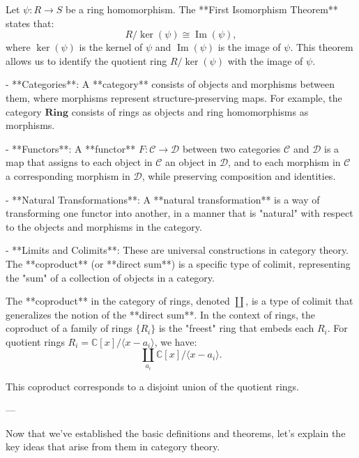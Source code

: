 \documentclass[11pt,openany]{article}
\begin{document}
Let \( \psi: R \to S \) be a ring homomorphism. The **First Isomorphism Theorem** states that:
\[
R / \ker(\psi) \cong \operatorname{Im}(\psi),
\]
where \( \ker(\psi) \) is the kernel of \( \psi \) and \( \operatorname{Im}(\psi) \) is the image of \( \psi \). This theorem allows us to identify the quotient ring \( R / \ker(\psi) \) with the image of \( \psi \).


- **Categories**: A **category** consists of objects and morphisms between them, where morphisms represent structure-preserving maps. For example, the category \( \mathbf{Ring} \) consists of rings as objects and ring homomorphisms as morphisms.

- **Functors**: A **functor** \( F: \mathcal{C} \to \mathcal{D} \) between two categories \( \mathcal{C} \) and \( \mathcal{D} \) is a map that assigns to each object in \( \mathcal{C} \) an object in \( \mathcal{D} \), and to each morphism in \( \mathcal{C} \) a corresponding morphism in \( \mathcal{D} \), while preserving composition and identities.

- **Natural Transformations**: A **natural transformation** is a way of transforming one functor into another, in a manner that is "natural" with respect to the objects and morphisms in the category.

- **Limits and Colimits**: These are universal constructions in category theory. The **coproduct** (or **direct sum**) is a specific type of colimit, representing the "sum" of a collection of objects in a category.

The **coproduct** in the category of rings, denoted \( \coprod \), is a type of colimit that generalizes the notion of the **direct sum**. In the context of rings, the coproduct of a family of rings \( \{R_i\} \) is the "freest" ring that embeds each \( R_i \). For quotient rings \( R_i = \mathbb{C}[x] / \langle x - a_i \rangle \), we have:
\[
\coprod_{a_i} \mathbb{C}[x] / \langle x - a_i \rangle.
\]

This coproduct corresponds to a disjoint union of the quotient rings.

---


Now that we've established the basic definitions and theorems, let’s explain the key ideas that arise from them in category theory.
\end{document}
